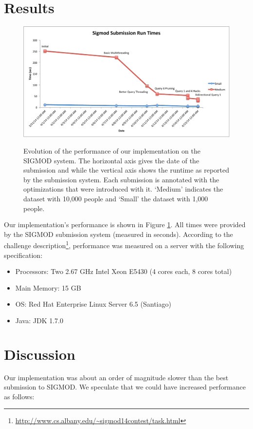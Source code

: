 \documentclass{article}
\begin{document}
\section{Results}
\label{sec:results}
\begin{figure}
  \centering
  \includegraphics[scale=0.5]{img/results.pdf}
  \label{fig:results}
  \caption{Evolution of the performance of our implementation on the
    SIGMOD system.  The horizontal axis gives the date of the
    submission and while the vertical axis shows the runtime as
    reported by the submission system.  Each submission is annotated
    with the optimizations that were introduced with it.  `Medium'
    indicates the dataset with 10,000 people and `Small' the dataset
    with 1,000 people.}
\end{figure}

Our implementation's performance is shown in Figure \ref{fig:results}.  All times were provided by the SIGMOD submission system (measured in seconds).  According to the challenge description\footnote{\url{http://www.cs.albany.edu/~sigmod14contest/task.html}}, performance was measured on a server with the following specification:
\begin{itemize}
\item Processors: Two 2.67 GHz Intel Xeon E5430 (4 cores each, 8 cores total)
\item Main Memory: 15 GB
\item OS: Red Hat Enterprise Linux Server 6.5 (Santiago) 
\item Java: JDK 1.7.0
\end{itemize}

\section{Discussion}
Our implementation was about an order of magnitude slower than the
best submission to SIGMOD.  We speculate that we could have increased
performance as follows:
\end{document}
